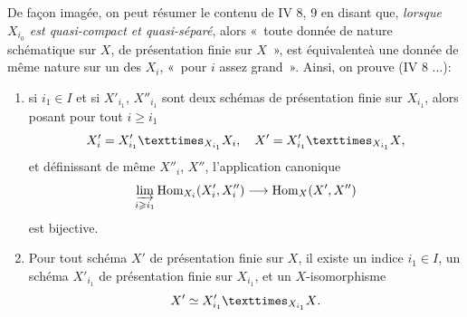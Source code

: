 \documentclass[10pt]{../fichiers-configuration-latex/smfart}
\begin{document}
\subsection{}

De façon imagée, on peut résumer le contenu de \EGA IV 8, 9 en
disant que, \emph{lorsque $X_{i_0}$ est quasi-compact et
quasi-séparé}, alors « toute donnée de nature schématique sur $X$,
de présentation finie sur $X$ », est équivalente\pageoriginale à une
donnée de même
nature sur un des $X_i$, « pour $i$ assez grand ». Ainsi, on prouve
(\EGA IV 8 $\ldots$):

\begin{enumerate}
\renewcommand{\theenumi}{\alph{enumi}}
\renewcommand{\labelenumi}{(\theenumi)}
\item si $i_1 \in I$ et si $X'_{i_1}$, $X''_{i_1}$ sont deux
schémas de présentation finie sur $X_{i_1}$, alors posant pour tout $i
\geq i_1$
$$
X'_{i} = \fprod{X'_{i_1}}{X_i}{X_{i_1}},\quad X' = \fprod{X'_{i_1}}{X}{X_{i_1}}{\quoi},
$$
et définissant de même $X''_i$, $X''$, l'application canonique
$$
\varinjlim_{i \geq i_1} \Hom_{X_i} (X'_i, X''_i) \to
\Hom_X (X', X'')
$$
est bijective.

\item Pour tout schéma $X'$ de présentation finie sur $X$, il existe
un indice $i_1 \in I$, un schéma $X'_{i_1}$ de présentation finie
sur $X_{i_1}$, et un $X$-isomorphisme
$$
X'\simeq \fprod{X'_{i_1}}{X}{X_{i_1}}{\quoi}.
$$
\end{enumerate}

\subsection{}
\end{document}

